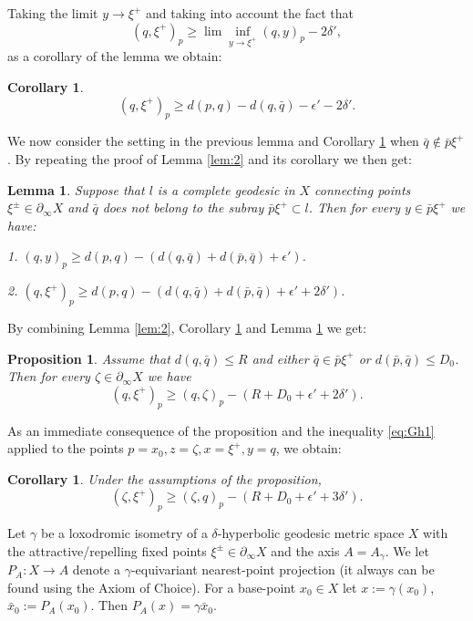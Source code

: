 \documentclass[12pt]{amsbook}%
\newtheorem{lem}[thm]{Lemma}
\newtheorem{prop}[thm]{Proposition}
\newtheorem{cor}[thm]{Corollary}
\theoremstyle{definition}
\theoremstyle{remark}
\numberwithin{section}{chapter}
\numberwithin{subsection}{section}
\numberwithin{figure}{chapter}
\def\eps{\epsilon}
\def\ga{\gamma}
\def\geo{\partial_\infty}
\begin{document}
Taking the limit $y\to \xi^+$ and taking into account the fact that
$$
(q,\xi^+)_p\geqslant \lim\inf_{y\to \xi^+} (q,y)_p -2\delta',
$$
as a corollary of the lemma we obtain:

\begin{cor}\label{cor:1}
$$
(q,\xi^+)_p\geqslant d(p,q) - d(q, \bar{q}) - \eps' - 2\delta'. 
$$
\end{cor}

We now consider the setting in the previous lemma and Corollary \ref{cor:1} when $\bar{q}\notin \bar{p}\xi^+$.
 By repeating the proof of Lemma \ref{lem:2} and its corollary we then get:

\begin{lem}\label{lem:3}
Suppose that $l$ is a complete geodesic in $X$ connecting points $\xi^\pm\in \geo X$ and $\bar{q}$ does not belong to the subray $\bar{p}\xi^+\subset l$. Then for every 
$y\in \bar{p}\xi^+$ we have:

1. $(q,y)_p\geqslant d(p,q) - \left(d(q, \bar{q}) + d(\bar{p}, \bar{q}) + \eps'\right)$. 

2. $(q,\xi^+)_p\geqslant d(p,q) - \left(d(q, \bar{q}) + d(\bar{p}, \bar{q}) + \eps' + 2\delta'\right)$. 
\end{lem}


By combining Lemma \ref{lem:2}, Corollary \ref{cor:1} and Lemma \ref{lem:3} we get: 

\begin{prop}
Assume that $d(q, \bar{q})\leqslant R$ and either $\bar{q}\in \bar{p}\xi^+$ or $d(\bar{p}, \bar{q})\leqslant D_0$. Then for every $\zeta\in \geo X$ we have
$$
(q,\xi^+)_p \geqslant (q,\zeta)_p - (R+D_0+\eps' + 2\delta').
$$
\end{prop}

As an immediate consequence of the proposition and the inequality \eqref{eq:Gh1} applied to the points $p=x_0, z=\zeta, x=\xi^+, y=q$, 
we obtain: 

\begin{cor}\label{cor: product inequality}
Under the assumptions of the proposition, 
$$
(\zeta,\xi^+)_p\geqslant (\zeta,q)_p - (R+D_0+\eps' + 3\delta'). 
$$
\end{cor}







Let $\gamma$ be a loxodromic isometry of a $\delta$-hyperbolic geodesic metric space $X$ with the attractive/repelling fixed points $\xi^\pm\in \geo X$ and the axis $A=A_\ga$. We let $P_A: X\to A$ denote a $\ga$-equivariant nearest-point projection (it always can be found using the Axiom of Choice). For a 
base-point $x_0\in X$ let $x:= \ga(x_0)$, $\bar{x}_0:=P_A(x_0)$. Then
$P_A(x)=\ga \bar{x}_0$. 
\end{document}
